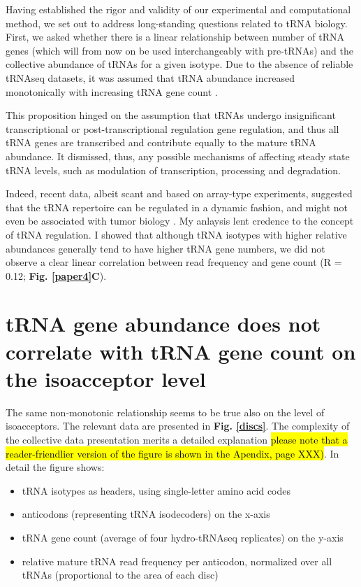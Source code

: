 \documentclass[12pt]{rockefeller}
\begin{document}
Having established the rigor and validity of our experimental and computational method, we set out to address long-standing questions related to tRNA biology. First, we asked whether there is a linear relationship between number of tRNA genes (which will from now on be used interchangeably with pre-tRNAs) and the collective abundance of tRNAs for a given isotype. Due to the absence of reliable tRNAseq datasets, it was assumed that tRNA abundance increased monotonically with increasing tRNA gene count \cite{Iben:2014dt,Pechmann:2012ey,Tuller:2010ge}. 

This proposition hinged on the assumption that tRNAs undergo insignificant transcriptional or post-transcriptional regulation gene regulation, and thus all tRNA genes are transcribed and contribute equally to the mature tRNA abundance. It dismissed, thus, any possible mechanisms of affecting steady state tRNA levels, such as modulation of transcription, processing and degradation. 

Indeed, recent data, albeit scant and based on array-type experiments, suggested that the tRNA repertoire can be regulated in a dynamic fashion, and might not even be associated with tumor biology \cite{Gingold:2014iz}. My anlaysis lent credence to the concept of tRNA regulation. I showed that although tRNA isotypes with higher relative abundances generally tend to have higher tRNA gene numbers, we did not observe a clear linear correlation between read frequency and gene count (R = 0.12; \textbf{Fig. \ref{paper4}C}).

\section{tRNA gene abundance does not correlate with tRNA gene count on the isoacceptor level}
The same non-monotonic relationship seems to be true also on the level of \gls{isoacceptors}. The relevant data are presented in \textbf{Fig. \ref{discs}}. 
The complexity of the collective data presentation merits a detailed explanation \hl{please note that a reader-friendlier version of the figure is shown in the Apendix, page XXX)}. In detail the figure shows:

\begin{itemize}
\item tRNA isotypes as headers, using single-letter amino acid codes
\item anticodons (representing tRNA isodecoders) on the x-axis
\item tRNA gene count (average of four hydro-tRNAseq replicates) on the y-axis
\item relative mature tRNA read frequency per anticodon, normalized over all tRNAs (proportional to the area of each disc)
\end{itemize}
\end{document}
